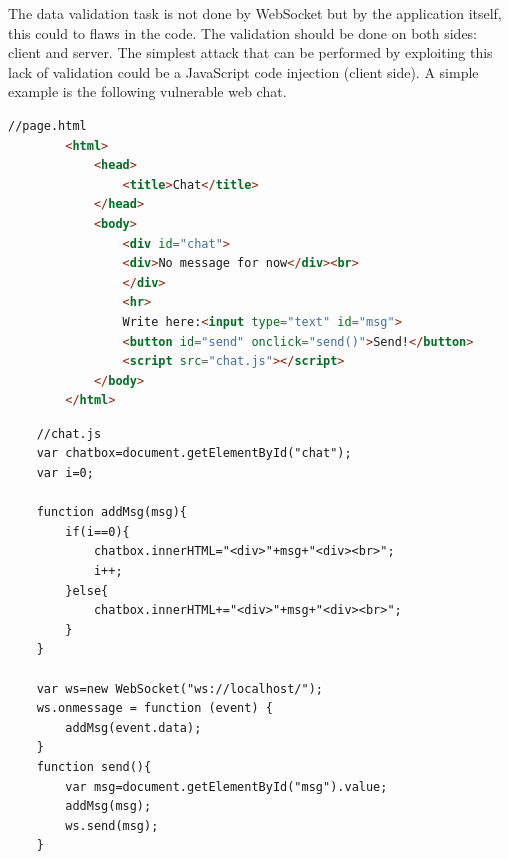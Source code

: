 	The data validation task is not done by WebSocket but by the application itself, this could to flaws in the code.\newline
	The validation should be done on both sides: client and server.\newline
	The simplest attack that can be performed by exploiting this lack of validation could be a JavaScript code injection (client side).\newline
	A simple example is the following vulnerable web chat.\newline
	
	\begin{lstlisting}[language=html]
		//page.html
		<html>
			<head>
				<title>Chat</title>
			</head>
			<body>
				<div id="chat">
				<div>No message for now</div><br>
				</div>
				<hr>
				Write here:<input type="text" id="msg">
				<button id="send" onclick="send()">Send!</button>
				<script src="chat.js"></script>
			</body>
		</html>
	\end{lstlisting}
	
	\begin{lstlisting}
	//chat.js
	var chatbox=document.getElementById("chat");
	var i=0;
	
	function addMsg(msg){
		if(i==0){
			chatbox.innerHTML="<div>"+msg+"<div><br>";
			i++;
		}else{
			chatbox.innerHTML+="<div>"+msg+"<div><br>";
		}
	}
	
	var ws=new WebSocket("ws://localhost/");
	ws.onmessage = function (event) {
		addMsg(event.data);
	}
	function send(){
		var msg=document.getElementById("msg").value;
		addMsg(msg);
		ws.send(msg);
	}
	\end{lstlisting}
	
